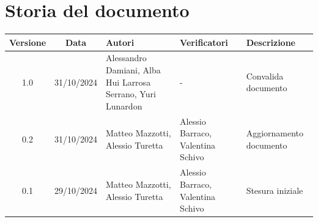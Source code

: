 

\section{Storia del documento}
\begin{tabularx}{\textwidth}{ c c p{3.2cm} p{2.75cm} X }
    \rowcolor{gray!20}\rule{0pt}{0.5cm}\textbf{Versione} & \textbf{Data} & \textbf{Autori} & \textbf{Verificatori} & \textbf{Descrizione} \\[0.7ex]
    \hline
    \rule{0pt}{0.5cm}1.0 & 31/10/2024 & Alessandro Damiani, \newline Alba Hui Larrosa Serrano, \newline Yuri Lunardon & - & Convalida documento \\[9.25ex]
    \hline
    \rule{0pt}{0.5cm}0.2 & 31/10/2024 & Matteo Mazzotti, \newline Alessio Turetta & Alessio Barraco, \newline Valentina Schivo & Aggiornamento documento \\[3.25ex]
    \hline
    \rule{0pt}{0.5cm}0.1 & 29/10/2024 & Matteo Mazzotti, \newline Alessio Turetta & Alessio Barraco, \newline Valentina Schivo & Stesura iniziale \\[0.7ex]
\end{tabularx}